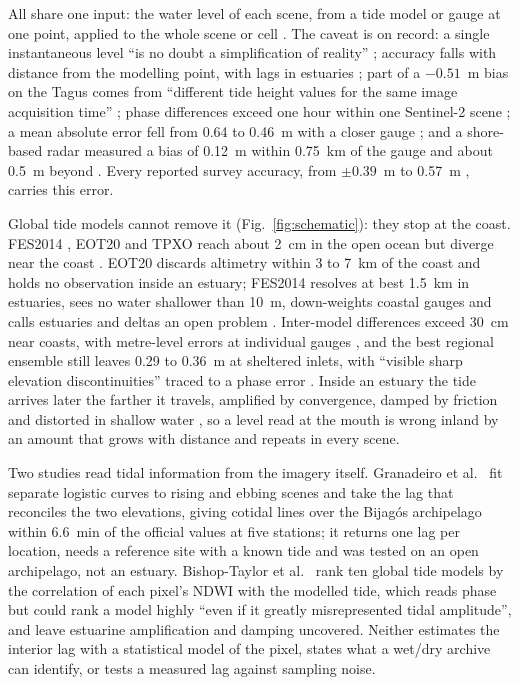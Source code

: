 \documentclass[final,5p,times,number]{elsarticle}
\begin{document}
All share one input: the water level of each scene, from a tide model or
gauge at one point, applied to the whole scene or cell
\cite{sagar2017,bishoptaylor2019ecss,bue2020,fitton2021,granadeiro2021,chen2025}.
The caveat is on record: a single instantaneous level ``is no doubt a
simplification of reality'' \cite{sagar2017}; accuracy falls with
distance from the modelling point, with lags in estuaries
\cite{bishoptaylor2019ecss}; part of a $-0.51$~m bias on the Tagus
comes from ``different tide height values for the same image
acquisition time'' \cite{bue2020}; phase differences exceed one hour
within one Sentinel-2 scene \cite{granadeiro2021}; a mean absolute
error fell from 0.64 to 0.46~m with a closer gauge \cite{chen2025}; and
a shore-based radar measured a bias of 0.12~m within 0.75~km of the
gauge and about 0.5~m beyond \cite{bell2016}. Every reported survey
accuracy, from $\pm 0.39$~m \cite{bishoptaylor2019ecss} to 0.57~m
\cite{sagar2017}, carries this error.

Global tide models cannot remove it (Fig.~\ref{fig:schematic}): they
stop at the coast. FES2014
\cite{lyard2021}, EOT20 \cite{hartdavis2021} and TPXO \cite{egbert2002}
reach about 2~cm in the open ocean but diverge near the coast
\cite{hartdavis2021}. EOT20 discards altimetry within 3 to 7~km of the
coast and holds no observation inside an estuary; FES2014 resolves at
best 1.5~km in estuaries, sees no water shallower than 10~m,
down-weights coastal gauges and calls estuaries and deltas an open
problem \cite{lyard2021}. Inter-model differences exceed 30~cm near
coasts, with metre-level errors at individual gauges \cite{wang2025},
and the best regional ensemble still leaves 0.29 to 0.36~m at sheltered
inlets, with ``visible sharp elevation discontinuities'' traced to a
phase error \cite{bishoptaylor2026}. Inside an estuary the tide arrives
later the farther it travels, amplified by convergence, damped by
friction and distorted in shallow water
\cite{friedrichs1994,savenije2005}, so a level read at the mouth is
wrong inland by an amount that grows with distance and repeats in every
scene.

Two studies read tidal information from the imagery itself. Granadeiro
et al.~\cite{granadeiro2021} fit separate logistic curves to rising and
ebbing scenes and take the lag that reconciles the two elevations,
giving cotidal lines over the Bijag\'os archipelago within 6.6~min of
the official values at five stations; it returns one lag per location,
needs a reference site with a known tide and was tested on an open
archipelago, not an estuary. Bishop-Taylor et
al.~\cite{bishoptaylor2026} rank ten global tide models by the
correlation of each pixel's NDWI with the modelled tide, which reads
phase but could rank a model highly ``even if it greatly misrepresented
tidal amplitude'', and leave estuarine amplification and damping
uncovered. Neither estimates the interior lag with a statistical model
of the pixel, states what a wet/dry archive can identify, or tests a
measured lag against sampling noise.
\end{document}
